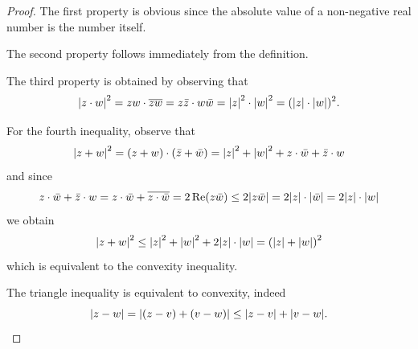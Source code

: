 \begin{proof}
The first property is obvious since the absolute value of a non-negative real
number is the number itself.

The second property follows immediately from the definition.

The third property is obtained by observing that 
\[
{\left|z\cdot w\right|}^2 
  = zw \cdot \overline{zw} 
  = z\bar z \cdot w\bar w = {\left|z\right|}^2 \cdot {\left|w\right|}^2 
  = ({\left|z\right|} \cdot {\left|w\right|})^2.
\]

For the fourth inequality, observe that
\[
  {\left|z+w\right|}^2 = (z+w)\cdot(\bar z + \bar w)
  = {\left|z\right|}^2 + {\left|w\right|}^2 + z\cdot \bar w + \bar z \cdot w
\]
and since
\[
  z\cdot \bar w + \bar z \cdot w
  = z \cdot \bar w + \overline{z \cdot \bar w}
  = 2 \operatorname{Re}(z\bar w)
  \le 2 {\left|z\bar w\right|}
  = 2 {\left|z\right|}\cdot{\left|\bar w\right|}
  = 2 {\left|z\right|}\cdot{\left|w\right|}
\]
we obtain
\[
 {\left|z+w\right|}^2 \le {\left|z\right|}^2+{\left|w\right|}^2 + 2 {\left|z\right|}\cdot{\left|w\right|}
 ={\left( {\left|z\right|} + {\left|w\right|} \right)}^2
\]
which is equivalent to the convexity inequality.

The triangle inequality is equivalent to convexity, indeed
\[
  {\left|z-w\right|} = {\left|(z-v) + (v-w)\right|}
  \le {\left|z-v\right|} + {\left|v-w\right|}.
\]
\end{proof}

